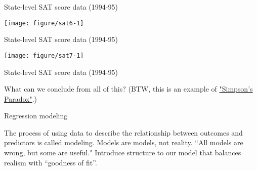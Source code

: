 \documentclass[table]{beamer}\usepackage[]{graphicx}\usepackage[]{color}
\makeatletter
\def\maxwidth{ %
  \ifdim\Gin@nat@width>\linewidth
    \linewidth
  \else
    \Gin@nat@width
  \fi
}
\newenvironment{knitrout}{}{} %
\makeatother
\begin{document}

\begin{frame}[fragile]{State-level SAT score data (1994-95)}

\begin{knitrout}
\color{fgcolor}
\texttt{[image: figure/sat6-1]} 

\end{knitrout}

\end{frame}




\begin{frame}[fragile]{State-level SAT score data (1994-95)}

\begin{knitrout}
\color{fgcolor}
\texttt{[image: figure/sat7-1]} 

\end{knitrout}

\end{frame}




\begin{frame}[fragile]{State-level SAT score data (1994-95)}

What can we conclude from all of this? (BTW, this is an example of \href{http://en.wikipedia.org/wiki/Simpson%27s_paradox}{"Simpson's Paradox"}.)

\end{frame}



\begin{frame}{Regression modeling}

The process of using data to describe the relationship between outcomes and predictors is called modeling.
\bi
	\myitem Models are models, not reality.
	\myitem ``All models are wrong, but some are useful."
	\myitem Introduce structure to our model that balances realism with ``goodness of fit''. \ei

\end{frame}




\end{document}
